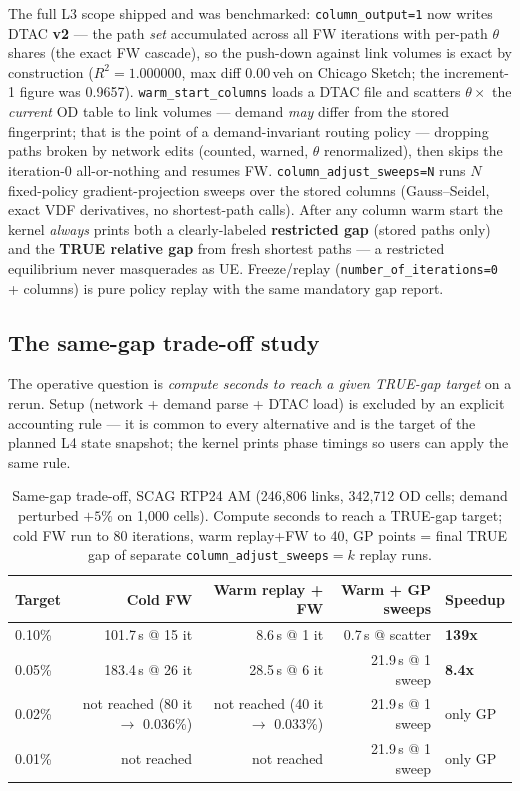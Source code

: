 \documentclass[10pt]{article}
\newcommand{\code}[1]{\texttt{#1}}
\begin{document}
The full L3 scope shipped and was benchmarked: \code{column\_output=1} now
writes DTAC \textbf{v2} --- the path \emph{set} accumulated across all FW
iterations with per-path $\theta$ shares (the exact FW cascade), so the
push-down against link volumes is exact by construction ($R^2 = 1.000000$,
max diff 0.00\,veh on Chicago Sketch; the increment-1 figure was 0.9657).
\code{warm\_start\_columns} loads a DTAC file and scatters $\theta \times$ the
\emph{current} OD table to link volumes --- demand \emph{may} differ from the
stored fingerprint; that is the point of a demand-invariant routing policy ---
dropping paths broken by network edits (counted, warned, $\theta$
renormalized), then skips the iteration-0 all-or-nothing and resumes FW.
\code{column\_adjust\_sweeps=N} runs $N$ fixed-policy gradient-projection
sweeps over the stored columns (Gauss--Seidel, exact VDF derivatives, no
shortest-path calls). After any column warm start the kernel \emph{always}
prints both a clearly-labeled \textbf{restricted gap} (stored paths only) and
the \textbf{TRUE relative gap} from fresh shortest paths --- a restricted
equilibrium never masquerades as UE. Freeze/replay
(\code{number\_of\_iterations=0} + columns) is pure policy replay with the
same mandatory gap report.

\subsection{The same-gap trade-off study}

The operative question is \emph{compute seconds to reach a given TRUE-gap
target} on a rerun. Setup (network + demand parse + DTAC load) is excluded
by an explicit accounting rule --- it is common to every alternative and is
the target of the planned L4 state snapshot; the kernel prints phase timings
so users can apply the same rule.

\begin{table}[h]
\centering
\caption{Same-gap trade-off, SCAG RTP24 AM (246{,}806 links, 342{,}712 OD
cells; demand perturbed $+5\%$ on 1{,}000 cells). Compute seconds to reach a
TRUE-gap target; cold FW run to 80 iterations, warm replay+FW to 40, GP
points = final TRUE gap of separate \code{column\_adjust\_sweeps}$=k$ replay
runs.}
\label{tab:samegap}
\small
\begin{tabular}{lrrrl}
\toprule
Target & Cold FW & Warm replay + FW & Warm + GP sweeps & Speedup \\
\midrule
0.10\% & 101.7\,s @ 15 it & 8.6\,s @ 1 it & 0.7\,s @ scatter & \textbf{139x} \\
0.05\% & 183.4\,s @ 26 it & 28.5\,s @ 6 it & 21.9\,s @ 1 sweep & \textbf{8.4x} \\
0.02\% & not reached (80 it $\to$ 0.036\%) & not reached (40 it $\to$ 0.033\%) & 21.9\,s @ 1 sweep & only GP \\
0.01\% & not reached & not reached & 21.9\,s @ 1 sweep & only GP \\
\bottomrule
\end{tabular}
\end{table}
\end{document}
